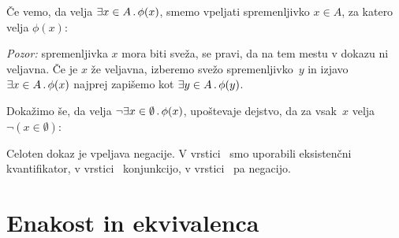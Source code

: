Če vemo, da velja $\exists x \in A \,.\, \phi(x)$, smemo vpeljati spremenljivko $x \in A$, za katero velja $\phi(x)$:
%
\begin{boxDisplay}
  \begin{boxedProof}[reserved]
    \begin{boxFrame}
      \boxGap
    \end{boxFrame}
  \end{boxedProof}
\end{boxDisplay}
%
\emph{Pozor:} spremenljivka $x$ mora biti sveža, se pravi, da na tem mestu v dokazu ni veljavna. Če je $x$ že veljavna, izberemo svežo spremenljivko~$y$ in izjavo $\exists x \in A \,.\, \phi(x)$ najprej zapišemo kot $\exists y \in A \,.\, \phi(y)$.

\begin{zgled}
  Dokažimo še, da velja $\neg \exists x \in \emptyset \,.\, \phi(x)$, upoštevaje dejstvo, da za vsak~$x$ velja
  $\neg (x \in \emptyset)$:
  \begin{boxDisplay}
  \begin{boxedProof}[numbered]
    \begin{boxFrame}
       
    \end{boxFrame}
  \end{boxedProof}
  \end{boxDisplay}
  Celoten dokaz je vpeljava negacije.
  V vrstici~ smo uporabili eksistenčni kvantifikator, v
  vrstici~ konjunkcijo, v vrstici~ pa negacijo.
\end{zgled}


\section{Enakost in ekvivalenca}
\label{sec:enakost-ekvivalenca}

